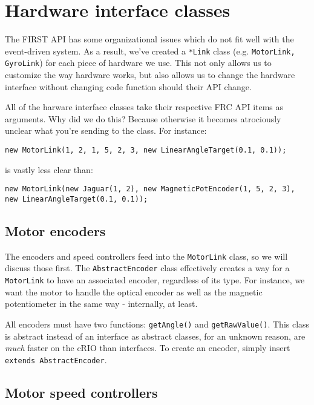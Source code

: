 \documentclass[a4paper]{article}
\begin{document}
\section{Hardware interface classes}

The FIRST API has some organizational issues which do not fit well with the event-driven system. As a result, we've created a \lstinline{*Link} class (e.g. \lstinline{MotorLink, GyroLink}) for each piece of hardware we use. This not only allows us to customize the way hardware works, but also allows us to change the hardware interface without changing code function should their API change.

All of the harware interface classes take their respective FRC API items as arguments. Why did we do this? Because otherwise it becomes atrociously unclear what you're sending to the class. For instance:
\begin{lstlisting}
new MotorLink(1, 2, 1, 5, 2, 3, new LinearAngleTarget(0.1, 0.1));
\end{lstlisting}
is vastly less clear than:
\begin{lstlisting}
new MotorLink(new Jaguar(1, 2), new MagneticPotEncoder(1, 5, 2, 3), new LinearAngleTarget(0.1, 0.1));
\end{lstlisting}

\subsection{Motor encoders}

The encoders and speed controllers feed into the \lstinline{MotorLink} class, so we will discuss those first. The \lstinline{AbstractEncoder} class effectively creates a way for a \lstinline{MotorLink} to have an associated encoder, regardless of its type. For instance, we want the motor to handle the optical encoder as well as the magnetic potentiometer in the same way - internally, at least.

All encoders must have two functions: \lstinline{getAngle()} and \lstinline{getRawValue()}. This class is abstract instead of an interface as abstract classes, for an unknown reason, are \textit{much} faster on the cRIO than interfaces. To create an encoder, simply insert \lstinline{extends AbstractEncoder}.

\subsection{Motor speed controllers}
\end{document}
